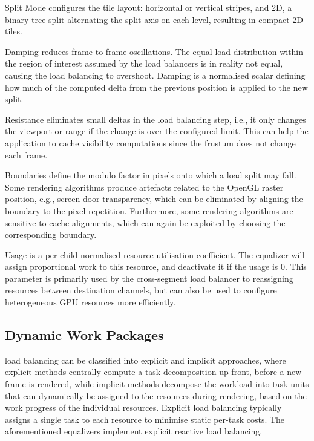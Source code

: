 \begin{compactdesc}
\item[Split Mode] configures the tile layout: horizontal or vertical stripes,
and 2D, a binary tree split alternating the split axis on each level, resulting
in compact 2D tiles.
\item[Damping] reduces frame-to-frame oscillations. The equal load distribution
within the region of interest assumed by the load balancers is in reality not
equal, causing the load balancing to overshoot. Damping is a normalised scalar
defining how much of the computed delta from the previous position is applied to
the new split.

\item[Resistance] eliminates small deltas in the load balancing step, i.e., it
only changes the viewport or range if the change is over the configured limit.
This can help the application to cache visibility computations since the
frustum does not change each frame.

\item[Boundaries] define the modulo factor in pixels onto which a load split may
fall. Some rendering algorithms produce artefacts related to the OpenGL raster
position, e.g., screen door transparency, which can be eliminated by aligning
the boundary to the pixel repetition. Furthermore, some rendering algorithms are
sensitive to cache alignments, which can again be exploited by choosing the
corresponding boundary.

\item[Usage] is a per-child normalised resource utilisation coefficient. The
equalizer will assign proportional work to this resource, and deactivate it if
the usage is 0. This parameter is primarily used by the cross-segment load
balancer to reassigning resources between destination channels, but can also be
used to configure heterogeneous GPU resources more efficiently.

\end{compactdesc}

\subsection{Dynamic Work Packages}

load balancing can be classified into explicit and implicit approaches, where
explicit methods centrally compute a task decomposition up-front, before a new
frame is rendered, while implicit methods decompose the workload into task
units that can dynamically be assigned to the resources during rendering, based
on the work progress of the individual resources. Explicit load balancing
typically assigns a single task to each resource to minimise static per-task
costs. The aforementioned equalizers implement explicit reactive load
balancing.


